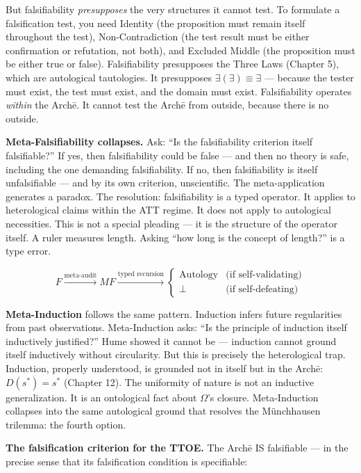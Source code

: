 \documentclass[10pt, openany, oneside]{book}
\begin{document}
But falsifiability \textit{presupposes} the very structures it cannot test. To formulate a falsification test, you need Identity (the proposition must remain itself throughout the test), Non-Contradiction (the test result must be either confirmation or refutation, not both), and Excluded Middle (the proposition must be either true or false). Falsifiability presupposes the Three Laws (Chapter 5), which are autological tautologies. It presupposes $\exists(\exists) \equiv \exists$ --- because the tester must exist, the test must exist, and the domain must exist. Falsifiability operates \textit{within} the Arch\={e}. It cannot test the Arch\={e} from outside, because there is no outside.

\textbf{Meta-Falsifiability collapses.} Ask: ``Is the falsifiability criterion itself falsifiable?'' If yes, then falsifiability could be false --- and then no theory is safe, including the one demanding falsifiability. If no, then falsifiability is itself unfalsifiable --- and by its own criterion, unscientific. The meta-application generates a paradox. The resolution: falsifiability is a typed operator. It applies to heterological claims within the ATT regime. It does not apply to autological necessities. This is not a special pleading --- it is the structure of the operator itself. A ruler measures length. Asking ``how long is the concept of length?'' is a type error.

$$F \xrightarrow{\text{meta-audit}} MF \xrightarrow{\text{typed recursion}} \begin{cases} \text{Autology} & \text{(if self-validating)} \\ \bot & \text{(if self-defeating)} \end{cases}$$

\textbf{Meta-Induction} follows the same pattern. Induction infers future regularities from past observations. Meta-Induction asks: ``Is the principle of induction itself inductively justified?'' Hume showed it cannot be --- induction cannot ground itself inductively without circularity. But this is precisely the heterological trap. Induction, properly understood, is grounded not in itself but in the Arch\={e}: $D(s^*) = s^*$ (Chapter 12). The uniformity of nature is not an inductive generalization. It is an ontological fact about $\Omega$'s closure. Meta-Induction collapses into the same autological ground that resolves the M\"{u}nchhausen trilemma: the fourth option.

\textbf{The falsification criterion for the TTOE.} The Arch\={e} IS falsifiable --- in the precise sense that its falsification condition is specifiable:
\end{document}

